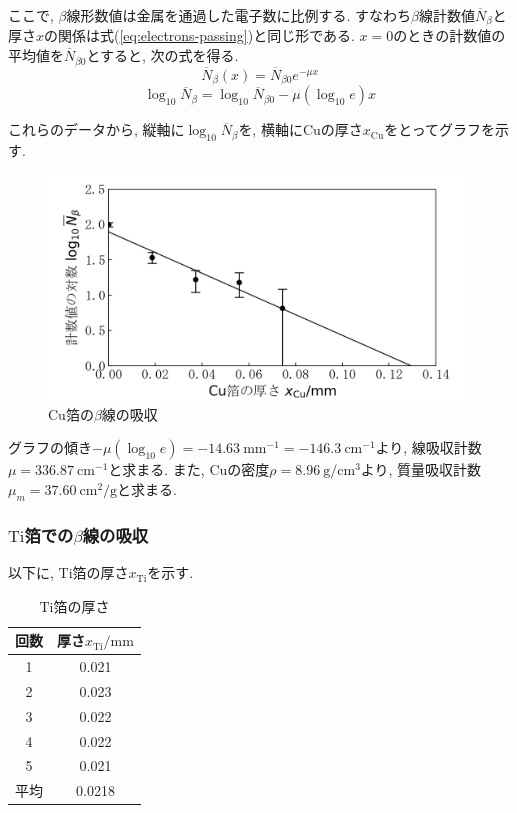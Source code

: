 \documentclass{jarticle}
\begin{document}
ここで, $\beta$線形数値は金属を通過した電子数に比例する.
すなわち$\beta$線計数値$\overline{N}_\beta$と厚さ$x$の関係は式(\ref{eq:electrons-passing})と同じ形である.
$x=0$のときの計数値の平均値を$\overline{N}_{\beta 0}$とすると, 次の式を得る.
\begin{equation}
  \overline{N}_\beta (x) = \overline{N}_{\beta 0} e^{-\mu x}
\end{equation}
\begin{equation}
  \log_{10}\overline{N}_\beta = \log_{10}\overline{N}_{\beta 0} - \mu(\log_{10}e)x
\end{equation}

これらのデータから, 縦軸に$\log_{10}\overline{N}_\beta$を, 横軸に$\mathrm{Cu}$の厚さ$x_\mathrm{Cu}$をとってグラフを示す.

\begin{figure}[H]
  \begin{center}
    \includegraphics[width=110mm]{graph/absorption-Cu.png}
    \caption{$\mathrm{Cu}$箔の$\beta$線の吸収}
    \label{fg:absorption-Cu}
  \end{center}
\end{figure}

グラフの傾き$-\mu(\log_{10}e)=-14.63\ \mathrm{mm}^{-1}=-146.3\ \mathrm{cm}^{-1}$より, 線吸収計数$\mu=336.87\ \mathrm{cm}^{-1}$と求まる.
また, $\mathrm{Cu}$の密度$\rho=8.96\ \mathrm{g}/\mathrm{cm}^3$より\cite{金属の密度}, 質量吸収計数$\mu_m=37.60\ \mathrm{cm}^2/\mathrm{g}$と求まる.


\subsubsection{$\mathrm{Ti}$箔での$\beta$線の吸収}

以下に, $\mathrm{Ti}$箔の厚さ$x_\mathrm{Ti}$を示す.

\begin{table}[H]
  \centering
  \caption{$\mathrm{Ti}$箔の厚さ}
  \label{tb:Ti-foil-thickness}
  \begin{tabular}{cc}
    \hline
    回数 & 厚さ$x_\mathrm{Ti}/\mathrm{mm}$ \\
    \hline
    1 & 0.021 \\
    2 & 0.023 \\
    3 & 0.022 \\
    4 & 0.022 \\
    5 & 0.021 \\
    \hline
    平均 & 0.0218 \\
    \hline
  \end{tabular}
\end{table}
\end{document}
